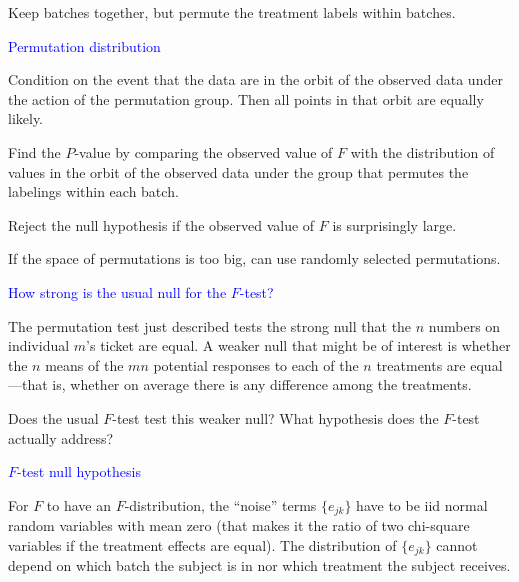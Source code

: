 \documentclass[landscape]{slides}
\begin{document}
\begin{slide}
\begin{slide}
Keep batches together, but permute the treatment labels within
batches.

\end{slide}

\begin{slide}
{\textcolor{blue}{Permutation distribution}}

Condition on the event that the data are in the orbit of the observed data under the
action of the permutation group.
Then all points in that orbit are equally likely.

Find the $P$-value by comparing the observed value of $F$ with the
distribution of values in the orbit of the observed data under the group
that permutes the labelings within each batch.

Reject the null hypothesis if the observed value of $F$ is surprisingly large.

If the space of permutations is too big, can use randomly selected permutations.

\end{slide}

\begin{slide}
{\textcolor{blue}{How strong is the usual null for the $F$-test?}}

The permutation test just described tests the strong null that
the $n$ numbers on individual $m$'s ticket are equal.
A weaker null that might be of interest is whether the $n$ means of the
$mn$ potential responses to each of the $n$ treatments are equal---that is,
whether on average there is any difference among the treatments.

Does the usual $F$-test test this weaker null?
What hypothesis does the $F$-test actually address?

\end{slide}

\begin{slide}
{\textcolor{blue}{$F$-test null hypothesis}}

For $F$ to have an $F$-distribution, the ``noise'' terms $\{e_{jk}\}$ 
have to be iid normal random variables with mean zero
(that makes it the ratio of two chi-square variables if the treatment
effects are equal).
The distribution of $\{e_{jk}\}$ cannot depend on which batch the subject is in nor
which treatment the subject receives.


\end{slide}
\end{slide}
\end{document}
